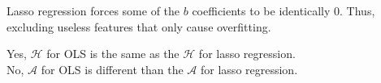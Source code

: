 \documentclass[12pt]{article}
\begin{document}
\begin{enumerate}
Lasso regression forces some of the $b$ coefficients to be identically 0. Thus, excluding useless features that only cause overfitting. 


Yes, $\mathcal{H}$ for OLS is the same as the $\mathcal{H}$ for lasso regression. \\
No, $\mathcal{A}$ for OLS is different than the $\mathcal{A}$ for lasso regression.


\end{enumerate}

\end{document}
